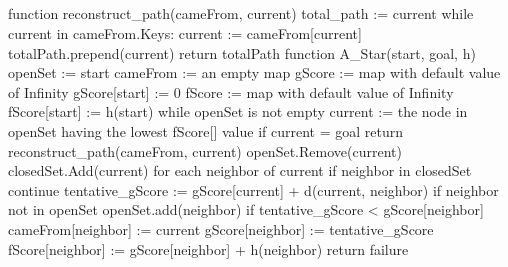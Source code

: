 \documentclass[
10pt, %
a4paper, %
oneside, %
headinclude,footinclude, %
BCOR5mm, %
]{scrartcl}
\newcommand\tab[1][1cm]{\hspace*{#1}}
\begin{document}
\subsection*{}
function reconstruct\_path(cameFrom, current)\newline
\tab total\_path := {current}\newline
\tab while current in cameFrom.Keys:\newline
\tab\tab current := cameFrom[current]\newline
\tab\tab totalPath.prepend(current)\newline
\tab return totalPath\newline
function A\_Star(start, goal, h)\newline
openSet := {start}\newline
\tab cameFrom := an empty map\newline
\tab gScore := map with default value of Infinity\newline
\tab gScore[start] := 0\newline
\tab fScore := map with default value of Infinity\newline
\tab fScore[start] := h(start)\newline
\tab while openSet is not empty\newline
\tab\tab current := the node in openSet having the lowest fScore[] value\newline
\tab\tab if current = goal\newline
\tab\tab\tab return reconstruct\_path(cameFrom, current)\newline
\tab\tab openSet.Remove(current)\newline
\tab\tab closedSet.Add(current)\newline
\tab\tab for each neighbor of current\newline
\tab\tab\tab if neighbor in closedSet \newline
\tab\tab\tab\tab continue\newline
\tab\tab\tab tentative\_gScore := gScore[current] + d(current, neighbor)\newline
\tab\tab\tab if neighbor not in openSet\newline
\tab\tab\tab\tab openSet.add(neighbor)\newline
\tab\tab\tab if tentative\_gScore < gScore[neighbor]\newline
\tab\tab\tab\tab cameFrom[neighbor] := current\newline
\tab\tab\tab\tab gScore[neighbor] := tentative\_gScore\newline
\tab\tab\tab\tab fScore[neighbor] := gScore[neighbor] + h(neighbor)\newline
\tab return failure\newline
\end{document}
